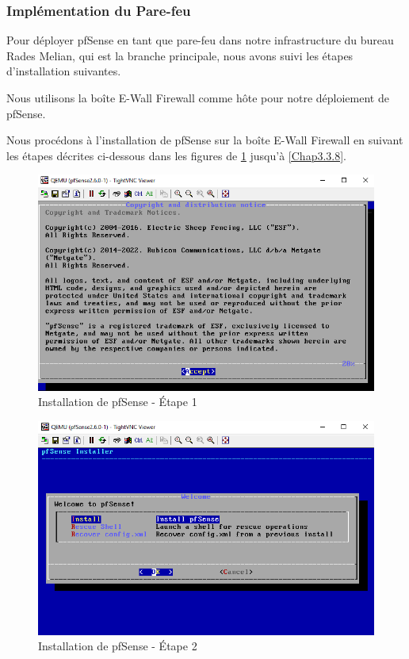 \subsubsection{Implémentation du Pare-feu}

Pour déployer pfSense en tant que pare-feu dans notre infrastructure du bureau Rades Melian, qui est la branche principale, nous avons suivi les étapes d'installation suivantes.


Nous utilisons la boîte E-Wall Firewall comme hôte pour notre déploiement de pfSense.


Nous procédons à l'installation de pfSense sur la boîte E-Wall Firewall en suivant les étapes décrites ci-dessous dans les figures de \ref{Chap3.3.2} jusqu'à \ref{Chap3.3.8}.

\begin{figure}[H]
\centering
\includegraphics[width=15cm]{Images/BRadesMelian-Topologie2.png}
\caption{Installation de pfSense - Étape 1}
\label{Chap3.3.2}
\end{figure}

\begin{figure}[H]
\centering
\includegraphics[width=15cm]{Images/BRadesMelian-Topologie3.png}
\caption{Installation de pfSense - Étape 2}
\label{Chap3.3.3}
\end{figure}

